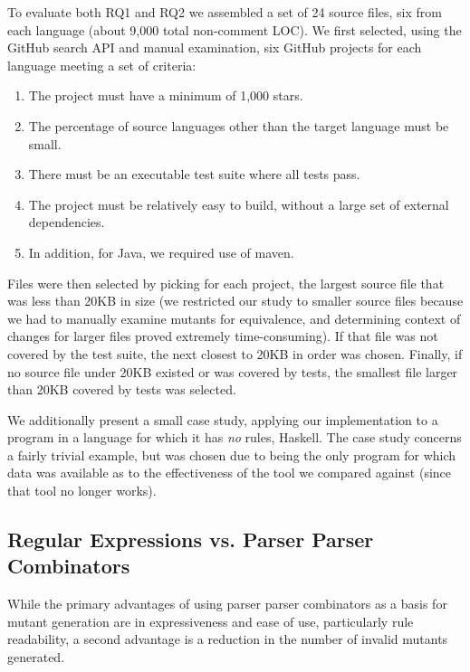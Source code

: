 \documentclass[acmsmall]{acmart}
\begin{document}
{To evaluate both RQ1 and RQ2 we assembled a set of 24 source files,
six from each language (about 9,000 total non-comment LOC).  We first selected, using the GitHub search
API and manual examination, six GitHub
projects for each language meeting a set of criteria:

\begin{enumerate}
\item The project must have a minimum of 1,000 stars.
  \item The percentage of source languages other than the target
    language must be small.
  \item There must be an executable test suite where all tests pass.
    \item The project must be relatively easy to build, without a
      large set of external dependencies.
      \item In addition, for Java, we required use of maven.
      \end{enumerate}

      Files were then selected by picking for each project, the
      largest source file that was less than 20KB in size (we
      restricted our study to smaller source files because we had to
      manually examine mutants for equivalence, and determining
      context of changes for larger files proved extremely time-consuming).  If that
      file was not covered by the test suite, the next closest to 20KB in order
      was chosen.  Finally, if no source file under 20KB existed or
      was covered by tests, the smallest file larger than 20KB covered
      by tests was selected.


We additionally present a small
case study, applying our implementation to a program in a language for
which it has \emph{no} rules, Haskell.  The case study concerns a
fairly trivial example, but was chosen due to being the only program
for which data was available as to the effectiveness of the tool we
compared against (since that tool no longer works).

\subsection{Regular Expressions vs. Parser Parser Combinators}

While the primary advantages of using parser parser combinators as a
basis for mutant generation are in expressiveness and ease of use,
particularly rule readability, a second advantage is a reduction in
the number of invalid mutants generated.

}
\end{document}
